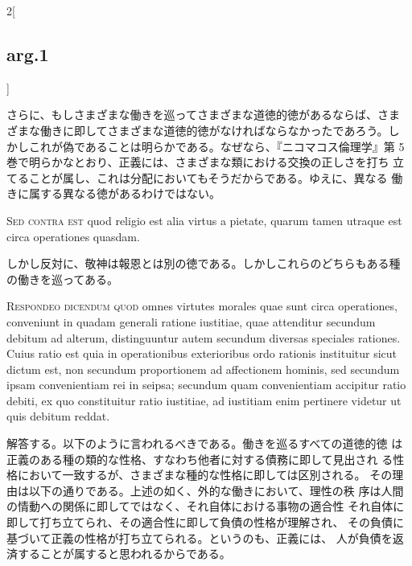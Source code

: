 \documentclass[paper=a4paper,fontsize=10pt,jafontsize=9pt,titlepage]{jlreq}
\begin{document}
\begin{paracol}{2}[\subsection{arg.1}]
\switchcolumn

さらに、もしさまざまな働きを巡ってさまざまな道徳的徳があるならば、さま
ざまな働きに即してさまざまな道徳的徳がなければならなかったであろう。し
かしこれが偽であることは明らかである。なぜなら、『ニコマコス倫理学』第
5巻で明らかなとおり、正義には、さまざまな類における交換の正しさを打ち
立てることが属し、これは分配においてもそうだからである。ゆえに、異なる
働きに属する異なる徳があるわけではない。

\switchcolumn*[\subsection{s.c.}]

{\scshape Sed contra est} quod religio est alia virtus a pietate,
quarum tamen utraque est circa operationes quasdam.

\switchcolumn

しかし反対に、敬神は報恩とは別の徳である。しかしこれらのどちらもある種
の働きを巡ってある。


{\scshape Respondeo dicendum quod} omnes virtutes morales quae sunt
circa operationes, conveniunt in quadam generali ratione iustitiae,
quae attenditur secundum debitum ad alterum, distinguuntur autem
secundum diversas speciales rationes. Cuius ratio est quia in
operationibus exterioribus ordo rationis instituitur sicut dictum est,
non secundum proportionem ad affectionem hominis, sed secundum ipsam
convenientiam rei in seipsa; secundum quam convenientiam accipitur
ratio debiti, ex quo constituitur ratio iustitiae, ad iustitiam enim
pertinere videtur ut quis debitum reddat.

\switchcolumn

解答する。以下のように言われるべきである。働きを巡るすべての道徳的徳
 は正義のある種の類的な性格、すなわち他者に対する債務に即して見出され
 る性格において一致するが、さまざまな種的な性格に即しては区別される。
 その理由は以下の通りである。上述の如く、外的な働きにおいて、理性の秩
 序は人間の情動への関係に即してではなく、それ自体における事物の適合性
 それ自体に即して打ち立てられ、その適合性に即して負債の性格が理解され、
 その負債に基づいて正義の性格が打ち立てられる。というのも、正義には、
 人が負債を返済することが属すると思われるからである。

\switchcolumn*


\end{paracol}
\end{document}

